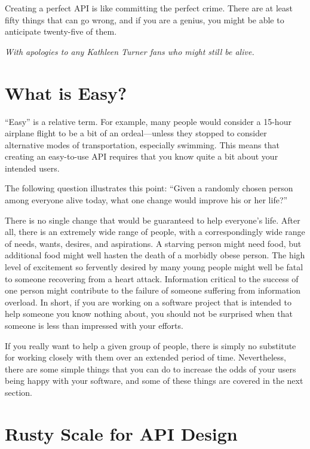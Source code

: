 

\epigraph{Creating a perfect API is like committing the perfect crime.
	  There are at least fifty things that can go wrong, and if you are
	  a genius, you might be able to anticipate twenty-five of them.}
	 {\emph{With apologies to any Kathleen Turner fans who might
	  still be alive.}}

\section{What is Easy?}
\label{sec:easy:What is Easy?}

``Easy'' is a relative term.
For example, many people would consider a 15-hour airplane flight to be
a bit of an ordeal---unless they stopped to consider alternative modes
of transportation, especially swimming.
This means that creating an easy-to-use API requires that you know
quite a bit about your intended users.

The following question illustrates this point: ``Given a randomly chosen
person among everyone alive today, what one change would
improve his or her life?''

There is no single change that would be guaranteed to help everyone's life.
After all, there is an extremely wide range of people, with a correspondingly
wide range of needs, wants, desires, and aspirations.
A starving person might need food, but additional food might well hasten
the death of a morbidly obese person.
The high level of excitement so fervently desired by many young people
might well be fatal to someone recovering from a heart attack.
Information critical to the success of one person might contribute to
the failure of someone suffering from information overload.
In short, if you are working on a software project that is intended to
help someone you know nothing about, you should not be surprised when
that someone is less than impressed with your efforts.

If you really want to help a given group of people, there is simply no
substitute for working closely with them over an extended period of time.
Nevertheless, there are some simple things that you can do to increase
the odds of your users being happy with your software, and some of these
things are covered in the next section.

\section{Rusty Scale for API Design}
\label{sec:easy:Rusty Scale for API Design}

